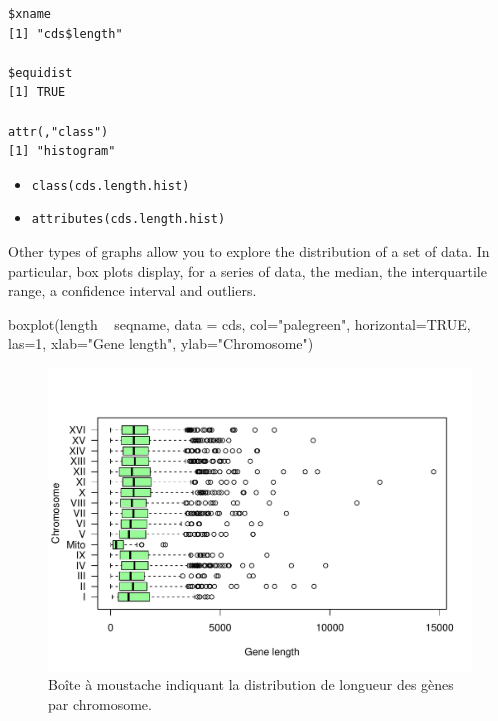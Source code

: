 \documentclass[]{article}
\newenvironment{Shaded}{\begin{snugshade}}{\end{snugshade}}
\newcommand{\KeywordTok}[1]{\textcolor[rgb]{0.94,0.87,0.69}{#1}}
\newcommand{\DataTypeTok}[1]{\textcolor[rgb]{0.87,0.87,0.75}{#1}}
\newcommand{\DecValTok}[1]{\textcolor[rgb]{0.86,0.86,0.80}{#1}}
\newcommand{\StringTok}[1]{\textcolor[rgb]{0.80,0.58,0.58}{#1}}
\newcommand{\OtherTok}[1]{\textcolor[rgb]{0.94,0.94,0.56}{#1}}
\newcommand{\OperatorTok}[1]{\textcolor[rgb]{0.94,0.94,0.82}{#1}}
\newcommand{\NormalTok}[1]{\textcolor[rgb]{0.80,0.80,0.80}{#1}}
\providecommand{\tightlist}{%
  \setlength{\itemsep}{0pt}\setlength{\parskip}{0pt}}
\begin{document}
\begin{verbatim}
$xname
[1] "cds$length"

$equidist
[1] TRUE

attr(,"class")
[1] "histogram"
\end{verbatim}

\begin{itemize}
\tightlist
\item
  \texttt{class(cds.length.hist)}
\item
  \texttt{attributes(cds.length.hist)}
\end{itemize}

Other types of graphs allow you to explore the distribution of a set of
data. In particular, box plots display, for a series of data, the
median, the interquartile range, a confidence interval and outliers.

\begin{Shaded}
\begin{Highlighting}[]
\KeywordTok{boxplot}\NormalTok{(length }\OperatorTok{~}\StringTok{ }\NormalTok{seqname, }\DataTypeTok{data =}\NormalTok{ cds, }\DataTypeTok{col=}\StringTok{"palegreen"}\NormalTok{, }\DataTypeTok{horizontal=}\OtherTok{TRUE}\NormalTok{, }\DataTypeTok{las=}\DecValTok{1}\NormalTok{, }\DataTypeTok{xlab=}\StringTok{"Gene length"}\NormalTok{, }\DataTypeTok{ylab=}\StringTok{"Chromosome"}\NormalTok{)}
\end{Highlighting}
\end{Shaded}

\begin{figure}

{\centering \includegraphics{figures/unnamed-chunk-24-1} 

}

\caption{Boîte à moustache indiquant la distribution de longueur des gènes par chromosome. }\label{fig:unnamed-chunk-24}
\end{figure}
\end{document}
